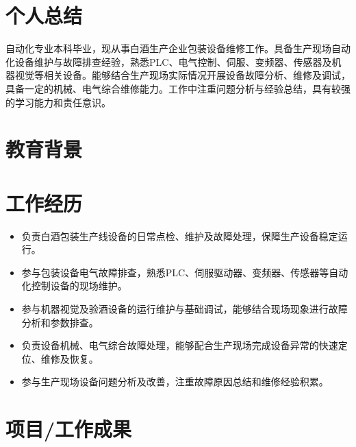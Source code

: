 \documentclass{resume}
\begin{document}


 
\section{个人总结}

自动化专业本科毕业，现从事白酒生产企业包装设备维修工作。具备生产现场自动化设备维护与故障排查经验，熟悉PLC、电气控制、伺服、变频器、传感器及机器视觉等相关设备。能够结合生产现场实际情况开展设备故障分析、维修及调试，具备一定的机械、电气综合维修能力。工作中注重问题分析与经验总结，具有较强的学习能力和责任意识。

\section{教育背景}


\section{工作经历}


\begin{itemize}
  \item 负责白酒包装生产线设备的日常点检、维护及故障处理，保障生产设备稳定运行。
  \item 参与包装设备电气故障排查，熟悉PLC、伺服驱动器、变频器、传感器等自动化控制设备的现场维护。
  \item 参与机器视觉及验酒设备的运行维护与基础调试，能够结合现场现象进行故障分析和参数排查。
  \item 负责设备机械、电气综合故障处理，能够配合生产现场完成设备异常的快速定位、维修及恢复。
  \item 参与生产现场设备问题分析及改善，注重故障原因总结和维修经验积累。
\end{itemize}
\section{项目/工作成果}
\end{document}
